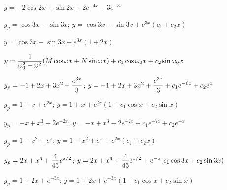 \quad \quad\;  \;  $y=-2\cos2x+\sin2x+2e^{-4x}-3e^{-3x}$

 $y_{p}=\cos3x-\sin3x$;
 $y=\cos3x-\sin3x+e^{3x}(c_{1}+c_{2}x)$

\quad\;  \;  $y=\cos3x-\sin3x+e^{3x}(1+2x)$

$y=\displaystyle\frac{1}{\omega_{0}^{2}-\omega^{2}}(M\cos\omega x+N\sin\omega
x)+c_{1}\cos\omega_{0}x+c_{2}\sin\omega_{0}x$

 $y_{p}=-1+2x+3x^{2}+\displaystyle\frac{e^{3x}}{3}$;
 $y=-1+2x+3x^{2}+\displaystyle\frac{e^{3x}}{3}+c_{1}e^{-6x}+c_{2}e^{x}$

$y_{p}=1+x+e^{2x}$;   $y=1+x+e^{2x}(1+c_{1}\cos x+c_{2}\sin x)$

$y_{p}=-x+x^{3}-2e^{-2x}$;    $y=-x+x^{3}-2e^{-2x}+c_{1}e^{-7x}+c_{2}e^{-x}$

$y_{p}=1-x^{2}+e^{x}$;    $y=1-x^{2}+e^{x}+e^{2x}(c_{1}+c_{2}x)$

$y_{p}=2x+x^{3}+\displaystyle\frac{4}{45}e^{x/2}$;
$y=2x+x^{3}+\displaystyle\frac{4}{45}e^{x/2}+e^{-x}(c_{1}\cos3x+c_{2}\sin3x)$

$y_{p}=1+2x+e^{-3x}$;   $y=1+2x+e^{-3x}(1+c_{1}\cos x+c_{2}\sin x)$

